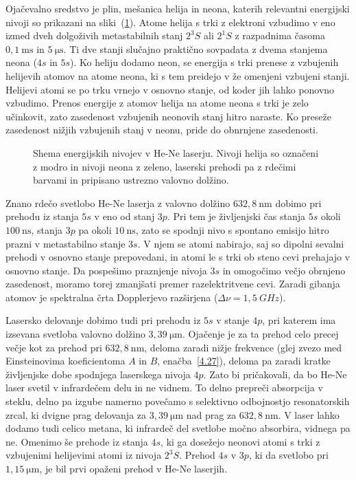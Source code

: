 Ojačevalno sredstvo je plin, mešanica helija in neona, katerih relevantni
energijski nivoji so prikazani na sliki~(\ref{fig:HeNeE}). 
Atome helija
s trki z elektroni vzbudimo v eno izmed dveh dolgoživih metastabilnih stanj $2^3S$ ali
$2^1S$ z razpadnima časoma $0,1~\si{\milli\second}$ in $5~\si{\micro\second}$.
Ti dve stanji slučajno praktično sovpadata z dvema stanjema neona ($4s$ in $5s$). 
Ko heliju dodamo neon, se energija s trki 
prenese z vzbujenih helijevih atomov na atome neona, ki s tem preidejo v 
že omenjeni vzbujeni stanji. Helijevi atomi se po trku vrnejo v osnovno stanje, od koder
jih lahko ponovno vzbudimo. Prenos energije z atomov helija na atome neona s trki je 
zelo učinkovit, zato zasedenost vzbujenih neonovih stanj hitro naraste. Ko preseže 
zasedenost nižjih vzbujenih stanj v neonu, pride do obnrnjene zasedenosti. 

\begin{figure}[h]
\centering
\def\svgwidth{100truemm} 

\caption{Shema energijskih nivojev v He-Ne laserju. Nivoji helija so označeni
z modro in nivoji neona z zeleno, laserski prehodi pa z rdečimi barvami in pripisano
ustrezno valovno dolžino.}
\label{fig:HeNeE}
\end{figure}

Znano rdečo svetlobo He-Ne laserja z valovno dolžino $632,8~\si{\nano\metre}$ dobimo 
pri prehodu iz stanja $5s$ v eno od stanj $3p$. Pri tem je življenjski čas 
stanja $5s$ okoli $100~\si{\nano\second}$, stanja $3p$ pa okoli $10~\si{\nano\second}$, zato
se spodnji nivo s spontano emisijo hitro prazni  v metastabilno stanje $3s$. 
V njem se atomi nabirajo, saj so dipolni sevalni prehodi v osnovno stanje prepovedani,
in atomi le s trki ob steno cevi prehajajo v osnovno stanje. Da pospešimo
praznjenje nivoja $3s$ in omogočimo večjo obrnjeno zasedenost, moramo torej 
zmanjšati premer razelektritvene cevi. Zaradi gibanja atomov je spektralna 
črta Dopplerjevo razširjena ($\Delta \nu = 1,5~\si{GHz}$). 

Lasersko delovanje dobimo tudi pri prehodu iz $5s$ v stanje $4p$, pri katerem 
ima izsevana svetloba valovno dolžino $3,39~\si{\micro\metre}$. 
Ojačenje je za ta prehod celo precej večje kot za
prehod pri $632,8~\si{\nano\metre}$, deloma zaradi nižje frekvence 
(glej zvezo med Einsteinovima koeficientoma $A$ in $B$, enačba~\ref{4.27}), 
deloma pa zaradi kratke življenjske dobe spodnjega laserskega nivoja $4p$. 
Zato bi pričakovali, da bo He-Ne laser svetil v infrardečem delu in ne vidnem. 
To delno prepreči absorpcija v steklu, delno pa izgube namerno povečamo s selektivno odbojnostjo
resonatorskih zrcal, ki dvigne prag delovanja za $3,39~\si{\micro\metre}$ 
nad prag za $632,8~\si{\nano\metre}$. V laser lahko dodamo tudi
celico metana, ki infrardeč del svetlobe močno absorbira, vidnega pa ne.
Omenimo še prehode iz stanja $4s$, ki ga dosežejo neonovi atomi s trki
z vzbujenimi helijevimi atomi iz nivoja $2^3S$. Prehod $4s$ v $3p$, ki da svetlobo
pri $1,15~\si{\micro\metre}$, je bil prvi opaženi prehod v He-Ne laserjih.

